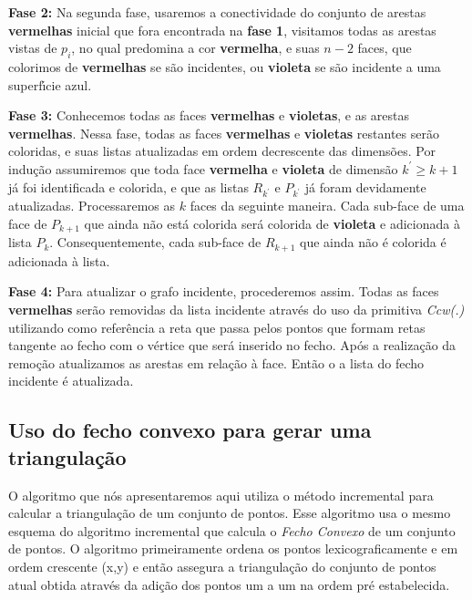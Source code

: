\documentclass[12pt,a4paper]{book}
\begin{document}
{\bf Fase 2:} Na segunda fase, usaremos a conectividade do conjunto de arestas 
\textbf{vermelhas} inicial que fora encontrada na \textbf{fase 1}, visitamos todas as arestas
vistas de $p_{i}$, no qual predomina a cor \textbf{\textbf{vermelha}}, e suas $n-2$ faces, que colorimos de
\textbf{vermelhas} se s\~{a}o incidentes, ou \textbf{violeta} se s\~{a}o incidente a uma superf\'{\i}cie azul. 

{\bf Fase 3:} Conhecemos todas as faces \textbf{vermelhas} e \textbf{violetas}, e as arestas
\textbf{vermelhas}. Nessa fase, todas as faces \textbf{vermelhas} e \textbf{violetas}
restantes ser\~{a}o coloridas, e suas listas atualizadas em ordem
decrescente das dimens\~{o}es. Por indu\c{c}\~{a}o assumiremos que toda face
\textbf{vermelha} e \textbf{violeta} de dimens\~{a}o $k^{\prime} \geq k+1$ j\'{a} foi
identificada e colorida, e que as listas $R_{k^{\prime}}$ e $P_{k^{\prime}}$ j\'{a} foram devidamente
atualizadas. Processaremos as $k$ faces da seguinte maneira. Cada sub-face de
uma face de $P_{k+1}$ que ainda n\~{a}o est\'{a} colorida ser\'{a} colorida de
\textbf{violeta} e adicionada \`{a} lista $P_{k}$. Consequentemente, cada sub-face de $R_{k+1}$
que ainda n\~{a}o \'{e} colorida \'{e} adicionada \`{a} lista.

{\bf Fase 4:} Para atualizar o grafo incidente, procederemos assim. Todas as faces
\textbf{vermelhas} ser\~{a}o removidas da lista incidente atrav\'{e}s do uso da primitiva \textit{Ccw(.)} utilizando como refer\^encia a reta que passa pelos pontos que formam retas tangente ao fecho com o v\'{e}rtice que ser\'{a} inserido no fecho. Ap\'{o}s a realiza\c{c}\~{a}o da remo\c{c}\~{a}o atualizamos as arestas em rela\c{c}\~{a}o \`{a} face. Ent\~{a}o o a lista do fecho incidente \'{e} atualizada.

\subsection{Uso do fecho convexo para gerar uma triangula\c{c}\~{a}o}

O algoritmo que n\'{o}s apresentaremos aqui utiliza o m\'{e}todo incremental para
calcular a triangula\c{c}\~{a}o de um conjunto de pontos. Esse algoritmo usa
o mesmo esquema do algoritmo incremental que calcula o \textit{Fecho Convexo} de um conjunto de pontos. O algoritmo primeiramente ordena os pontos lexicograficamente e em ordem crescente (x,y) e ent\~{a}o assegura a triangula\c{c}\~{a}o do conjunto de pontos atual obtida atrav\'{e}s da adi\c{c}\~{a}o dos pontos um a um na ordem pr\'{e} estabelecida.
\end{document}
